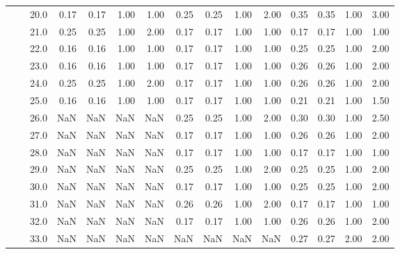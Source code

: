\begin{tabular}{lllrrrrrrrrrrrr}
       &     & 20.0 &       0.17 &      0.17 & 1.00 &   1.00 &       0.25 &      0.25 &  1.00 &   2.00 &       0.35 &      0.35 &  1.00 &   3.00 \\
       &     & 21.0 &       0.25 &      0.25 & 1.00 &   2.00 &       0.17 &      0.17 &  1.00 &   1.00 &       0.17 &      0.17 &  1.00 &   1.00 \\
       &     & 22.0 &       0.16 &      0.16 & 1.00 &   1.00 &       0.17 &      0.17 &  1.00 &   1.00 &       0.25 &      0.25 &  1.00 &   2.00 \\
       &     & 23.0 &       0.16 &      0.16 & 1.00 &   1.00 &       0.17 &      0.17 &  1.00 &   1.00 &       0.26 &      0.26 &  1.00 &   2.00 \\
       &     & 24.0 &       0.25 &      0.25 & 1.00 &   2.00 &       0.17 &      0.17 &  1.00 &   1.00 &       0.26 &      0.26 &  1.00 &   2.00 \\
       &     & 25.0 &       0.16 &      0.16 & 1.00 &   1.00 &       0.17 &      0.17 &  1.00 &   1.00 &       0.21 &      0.21 &  1.00 &   1.50 \\
       &     & 26.0 &        NaN &       NaN &  NaN &    NaN &       0.25 &      0.25 &  1.00 &   2.00 &       0.30 &      0.30 &  1.00 &   2.50 \\
       &     & 27.0 &        NaN &       NaN &  NaN &    NaN &       0.17 &      0.17 &  1.00 &   1.00 &       0.26 &      0.26 &  1.00 &   2.00 \\
       &     & 28.0 &        NaN &       NaN &  NaN &    NaN &       0.17 &      0.17 &  1.00 &   1.00 &       0.17 &      0.17 &  1.00 &   1.00 \\
       &     & 29.0 &        NaN &       NaN &  NaN &    NaN &       0.25 &      0.25 &  1.00 &   2.00 &       0.25 &      0.25 &  1.00 &   2.00 \\
       &     & 30.0 &        NaN &       NaN &  NaN &    NaN &       0.17 &      0.17 &  1.00 &   1.00 &       0.25 &      0.25 &  1.00 &   2.00 \\
       &     & 31.0 &        NaN &       NaN &  NaN &    NaN &       0.26 &      0.26 &  1.00 &   2.00 &       0.17 &      0.17 &  1.00 &   1.00 \\
       &     & 32.0 &        NaN &       NaN &  NaN &    NaN &       0.17 &      0.17 &  1.00 &   1.00 &       0.26 &      0.26 &  1.00 &   2.00 \\
       &     & 33.0 &        NaN &       NaN &  NaN &    NaN &        NaN &       NaN &   NaN &    NaN &       0.27 &      0.27 &  2.00 &   2.00 \\

\end{tabular}
